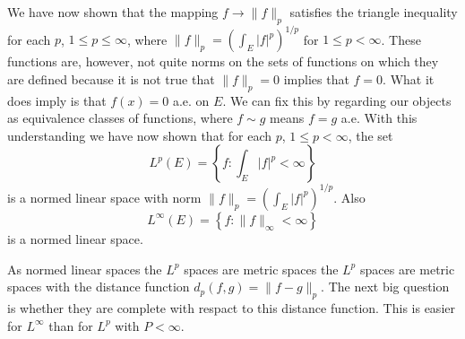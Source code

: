 \begin{rmk}%
	We have now shown that the mapping $f\rightarrow \|f\|_p$ satisfies the triangle 
	inequality for each $p$, $1\le p\le\infty$, where $\|f\|_p = (\int_E|f|^p)^{1/p}$ 
	for $1 \le p < \infty$. These functions are, however, not quite norms on the sets of 
	functions on which they are defined because it is not true that $\|f\|_p = 0$ implies 
	that $f = 0$. What it does imply is that $f(x) = 0$ a.e. on $E$. We can fix this by 
	regarding our objects as equivalence classes of functions, where $f \sim g$ means 
	$f = g$ a.e. With this understanding we have now shown that for each $p$, 
	$1 \le p < \infty$, the set 
	\begin{equation*}
		L^p(E) = \left\{f:\int_E|f|^p < \infty \right\}
	\end{equation*}
	is a normed linear space with norm $\|f\|_p = (\int_E|f|^p)^{1/p}$. Also 
	\begin{equation*}
		L^\infty(E) = \left\{f:\|f\|_\infty < \infty \right\}
	\end{equation*}
	is a normed linear space. 
\end{rmk}

\begin{rmk}%
	As normed linear spaces the $L^p$ spaces are metric spaces the $L^p$ spaces are 
	metric spaces with the distance function $d_p(f, g) = \|f - g\|_p$. The next big 
	question is whether they are complete with respact to this distance function. This 
	is easier for $L^\infty$ than for $L^p$ with $P < \infty$. 
\end{rmk}

